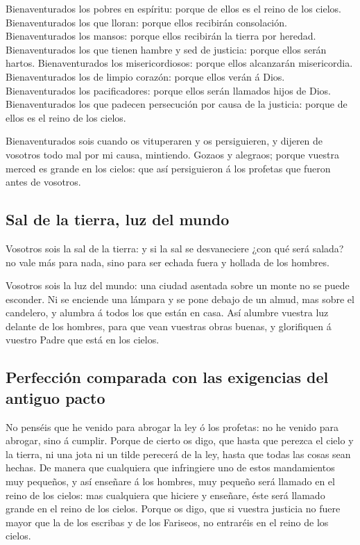  Bienaventurados los pobres en espíritu: porque de ellos
es el reino de los cielos.  Bienaventurados los que
lloran: porque ellos recibirán consolación. 
Bienaventurados los mansos: porque ellos recibirán la tierra por
heredad.  Bienaventurados los que tienen hambre y sed de
justicia: porque ellos serán hartos.  Bienaventurados los
misericordiosos: porque ellos alcanzarán misericordia. 
Bienaventurados los de limpio corazón: porque ellos verán á Dios.
 Bienaventurados los pacificadores: porque ellos serán
llamados hijos de Dios.  Bienaventurados los que padecen
persecución por causa de la justicia: porque de ellos es el reino de los
cielos.

 Bienaventurados sois cuando os vituperaren y os
persiguieren, y dijeren de vosotros todo mal por mi causa, mintiendo.
 Gozaos y alegraos; porque vuestra merced es grande en
los cielos: que así persiguieron á los profetas que fueron antes de
vosotros.

\hypertarget{sal-de-la-tierra-luz-del-mundo}{%
\subsection{Sal de la tierra, luz del
mundo}\label{sal-de-la-tierra-luz-del-mundo}}

 Vosotros sois la sal de la tierra: y si la sal se
desvaneciere ¿con qué será salada? no vale más para nada, sino para ser
echada fuera y hollada de los hombres.

 Vosotros sois la luz del mundo: una ciudad asentada
sobre un monte no se puede esconder.  Ni se enciende una
lámpara y se pone debajo de un almud, mas sobre el candelero, y alumbra
á todos los que están en casa.  Así alumbre vuestra luz
delante de los hombres, para que vean vuestras obras buenas, y
glorifiquen á vuestro Padre que está en los cielos.

\hypertarget{perfecciuxf3n-comparada-con-las-exigencias-del-antiguo-pacto}{%
\subsection{Perfección comparada con las exigencias del antiguo
pacto}\label{perfecciuxf3n-comparada-con-las-exigencias-del-antiguo-pacto}}

 No penséis que he venido para abrogar la ley ó los
profetas: no he venido para abrogar, sino á cumplir. 
Porque de cierto os digo, que hasta que perezca el cielo y la tierra, ni
una jota ni un tilde perecerá de la ley, hasta que todas las cosas sean
hechas.  De manera que cualquiera que infringiere uno de
estos mandamientos muy pequeños, y así enseñare á los hombres, muy
pequeño será llamado en el reino de los cielos: mas cualquiera que
hiciere y enseñare, éste será llamado grande en el reino de los cielos.
 Porque os digo, que si vuestra justicia no fuere mayor
que la de los escribas y de los Fariseos, no entraréis en el reino de
los cielos.

